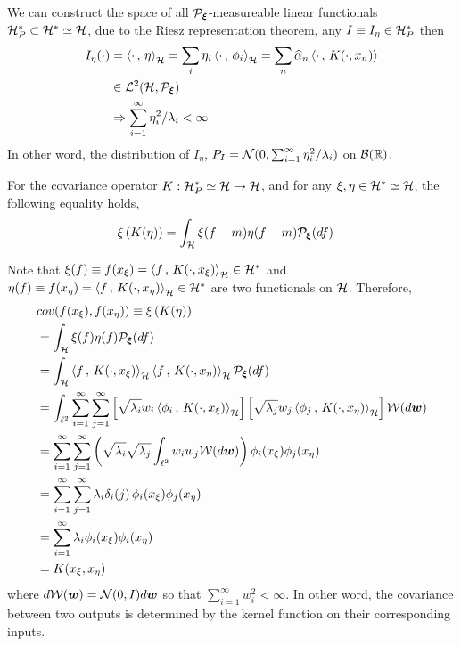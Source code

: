 \documentclass[11pt]{article}
\begin{document}
\begin{itemize}
We can construct the space of all ${\mathcal P}_{\boldsymbol{\xi}}$-measureable linear functionals ${\mathcal H}_{P}^{*}\subset {\mathcal H}^{*}\simeq {\mathcal H}$, due to the Riesz representation theorem, any $I\equiv I_{\eta} \in {\mathcal H}_{P}^{*}$ then
\begin{align*}
I_{\eta}(\cdot) &= \left\langle \cdot\,,\, \eta \right\rangle_{{\mathcal H}} = \sum_{i}\eta_{i}\left\langle \cdot\,,\, \phi_{i} \right\rangle_{{\mathcal H}} = \sum_{n}\widehat{\alpha}_{n}\left\langle \cdot\,,\, K(\cdot, x_{n}) \right\rangle \\
&\in {\mathcal L}^{2}({\mathcal H}, {\mathcal P}_{\boldsymbol{\xi}})\\
&\Rightarrow   \sum_{i=1}^{\infty}\eta_{i}^{2}/\lambda_{i}<\infty
\end{align*}
In other word, the distribution of $I_{\eta}$, $P_{I} = {\mathcal N}(0, \sum_{i=1}^{\infty}\eta_{i}^{2}/\lambda_{i})$ on ${\mathcal B}({\mathbb R})$.

For the covariance operator $K: {\mathcal H}_{P}^{*}\simeq {\mathcal H} \rightarrow {\mathcal H}$, and for any $\xi, \eta \in {\mathcal H}^{*} \simeq {\mathcal H} $,  the following equality holds,
\begin{align}
\xi\left( K(\eta ) \right) &= \int_{{\mathcal H}}\xi(f-m)\eta(f-m){\mathcal P}_{\boldsymbol{\xi}}(df) \nonumber
\end{align} 

Note that $\xi(f) \equiv f(x_{\xi})= \left\langle f\,,\, K(\cdot, x_{\xi}) \right\rangle_{{\mathcal H}}\in {\mathcal H}^{*}$ and $\eta(f)\equiv f(x_{\eta})= \left\langle f\,,\, K(\cdot, x_{\eta}) \right\rangle_{{\mathcal H}} \in {\mathcal H}^{*}$ are two functionals on ${\mathcal H}$. Therefore,
\begin{align*}
&cov(f(x_{\xi}), f(x_{\eta})) \equiv \xi\left( K(\eta ) \right)\\
&= \int_{{\mathcal H}}\xi(f)\eta(f){\mathcal P}_{\boldsymbol{\xi}}(df) \nonumber\\
&=  \int_{{\mathcal H}}\left\langle f\,,\, K(\cdot, x_{\xi}) \right\rangle_{{\mathcal H}}\left\langle f\,,\, K(\cdot, x_{\eta}) \right\rangle_{{\mathcal H}}{\mathcal P}_{\boldsymbol{\xi}}(df)\\
&= \int_{\ell^{2}}\sum_{i=1}^{\infty} \sum_{j=1}^{\infty} \left[\sqrt{\lambda_{i}}w_{i}\left\langle \phi_{i}\,,\, K(\cdot, x_{\xi}) \right\rangle_{{\mathcal H}}\right]\left[\sqrt{\lambda_{j}}w_{j}\left\langle \phi_{j}\,,\, K(\cdot, x_{\eta}) \right\rangle_{{\mathcal H}}\right] {\mathcal W}(d\boldsymbol{w})\\
&=\sum_{i=1}^{\infty} \sum_{j=1}^{\infty} \left( \sqrt{\lambda_{i}} \sqrt{\lambda_{j}} \int_{\ell^{2}}w_{i}w_{j}{\mathcal W}(d\boldsymbol{w})\right)\phi_{i}(x_{\xi})\phi_{j}(x_{\eta})\\
&= \sum_{i=1}^{\infty} \sum_{j=1}^{\infty}\lambda_{i}\delta_{i}(j)\,\phi_{i}(x_{\xi})\phi_{j}(x_{\eta})\\
&= \sum_{i=1}^{\infty}\lambda_{i}\phi_{i}(x_{\xi})\phi_{i}(x_{\eta})\\
&= K(x_{\xi}, x_{\eta})
\end{align*} where $d{\mathcal W}(\boldsymbol{w})= {\mathcal N}(0,I)d\boldsymbol{\boldsymbol{w}}$ so that $\sum_{i=1}^{\infty}w_{i}^{2}<\infty$. In other word, the covariance between two outputs is determined by the kernel function on their corresponding inputs.


\end{itemize}
\end{document}
